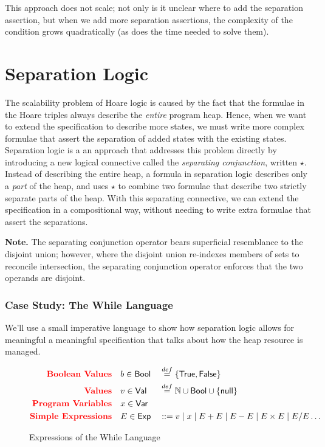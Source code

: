 \documentclass[11pt]{article}
\newcommand{\True}{\mathsf{True}}
\newcommand{\False}{\mathsf{False}}
\newcommand{\Val}{\mathsf{Val}}
\newcommand{\Bool}{\mathsf{Bool}}
\newcommand{\Var}{\mathsf{Var}}
\newcommand{\Exp}{\mathsf{Exp}}
\newcommand{\Null}{\mathsf{null}}
\begin{document}
This approach does not scale; not only is it unclear where to add the separation assertion, but when we add more separation assertions, the complexity of the condition grows quadratically (as does the time needed to solve them).

\section{Separation Logic}
The scalability problem of Hoare logic is caused by the fact that the formulae in the Hoare triples always describe the \emph{entire} program heap.
Hence, when we want to extend the specification to describe more states, we must write more complex formulae that assert the separation of added states with the existing states.
Separation logic is a an approach that addresses this problem directly by introducing a new logical connective called the \textit{separating conjunction}, written $\star$.
Instead of describing the entire heap, a formula in separation logic describes only a \emph{part} of the heap, and uses $\star$ to combine two formulae that describe two strictly separate parts of the heap.
With this separating connective, we can extend the specification in a compositional way, without needing to write extra formulae that assert the separations.

\textbf{Note.} The separating conjunction operator bears superficial resemblance to the disjoint union; however, where the disjoint union re-indexes members of sets to reconcile intersection, the separating conjunction operator enforces that the two operands are disjoint.

\subsubsection*{Case Study: The While Language}

We'll use a small imperative language to show how separation logic allows for meaningful a meaningful specification that talks about how the heap resource is managed.\\

\begin{figure}[H]
\centering
\begin{alignat*}{3}
\textbf{\textcolor{red}{Boolean Values}} &\quad b \in \Bool &&\on{def}{=} \{\True,\False \}\\
\textbf{\textcolor{red}{Values}}&\quad v \in \Val && \on{def}{=} \mathbb{N} \cup \Bool \cup \{ \Null \} \\
\textbf{\textcolor{red}{Program Variables}}&\quad x \in \Var &&  \\
\textbf{\textcolor{red}{Simple Expressions}}&\quad E \in \Exp && ::= v \mid x \mid E+E \mid E - E \mid E \times E \mid E / E \dots \\
\end{alignat*}
\caption{Expressions of the While Language}
\label{fig:while_e}
\end{figure}
\end{document}
